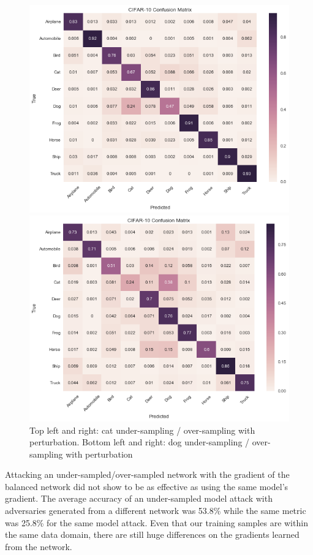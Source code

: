 \documentclass[runningheads,a4paper]{llncs}
\begin{document}
\begin{figure}
\begin{minipage}[b]{0.5\linewidth}
	\end{minipage} 
	\begin{minipage}[b]{0.5\linewidth}
		\centering
		\includegraphics[width=1\linewidth]{dog_undersampling_per.png} 
	\end{minipage}%
	\begin{minipage}[b]{0.5\linewidth}
		\centering
		\includegraphics[width=1\linewidth]{dog_oversampling_per.png} 
	\end{minipage} 
	\centering
	\caption{Top left and right: cat under-sampling / over-sampling with perturbation. Bottom left and right: dog under-sampling / over-sampling with perturbation}
	\label{fig:overlap}
\end{figure}
Attacking an under-sampled/over-sampled network with the gradient of the balanced network did not show to be as effective as using the same model's gradient. The average accuracy of an under-sampled model attack with adversaries generated from a different network was 53.8\% while the same metric was 25.8\% for the same model attack. Even that our training samples are within the same data domain, there are still huge differences on the gradients learned from the network. 
\end{document}
